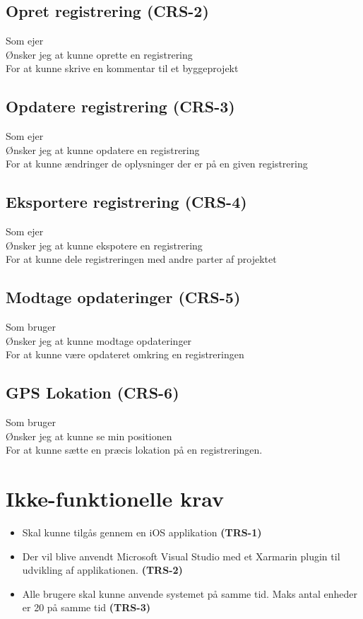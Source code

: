 	\subsection*{Opret registrering (CRS-2)}
	Som ejer\\
	Ønsker jeg at kunne oprette en registrering\\
	For at kunne skrive en kommentar til et byggeprojekt
	
	\subsection*{Opdatere registrering (CRS-3)}
	Som ejer\\
	Ønsker jeg at kunne opdatere en registrering\\
	For at kunne ændringer de oplysninger der er på en given registrering
	
	\subsection*{Eksportere registrering (CRS-4)}
	Som ejer\\
	Ønsker jeg at kunne ekspotere en registrering\\
	For at kunne dele registreringen med andre parter af projektet
	
	\subsection*{Modtage opdateringer (CRS-5)}
	Som bruger\\
	Ønsker jeg at kunne modtage opdateringer\\
	For at kunne være opdateret omkring en registreringen
	
	\subsection*{GPS Lokation (CRS-6)}
	Som bruger\\
	Ønsker jeg at kunne se min positionen \\
	For at kunne sætte en præcis lokation på en registreringen. \\
	
	\section{Ikke-funktionelle krav}
	\begin{itemize}[-]
		\itemsep 0.3em 
		\item Skal kunne tilgås gennem en iOS applikation \textbf{(TRS-1)}
		\item Der vil blive anvendt Microsoft Visual Studio med et Xarmarin plugin til udvikling af applikationen. \textbf{(TRS-2)}
		\item Alle brugere skal kunne anvende systemet på samme tid. Maks antal enheder er 20 på samme tid \textbf{(TRS-3)}
	\end{itemize}
	